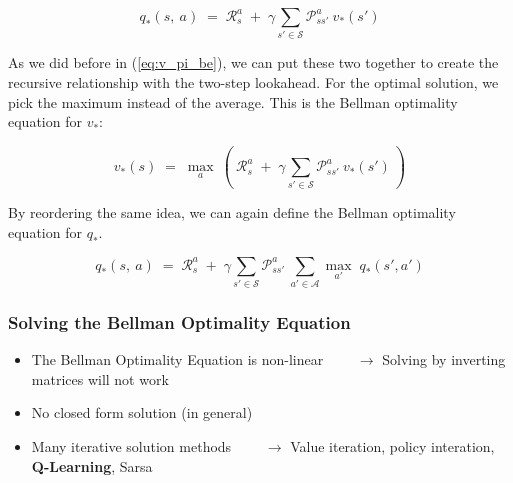 \documentclass[10pt]{article}
\begin{document}
\begin{equation}
q_{*}(s,\:a)\;=\;\mathcal{R}_{s}^{a}\;+\;\gamma \sum_{s' \in \mathcal{S}} \mathcal{P}_{ss'}^{a}\:v_{*}(s')
\end{equation}

As we did before in (\ref{eq:v_pi_be}), we can put these two together to create the recursive relationship with the two-step lookahead. For the optimal solution, we pick the maximum instead of the average. This is the Bellman optimality equation for $v_{*}$:

\begin{equation}
v_{*}(s)\;=\;\mathop{max}_{a}\: \left( \: \mathcal{R}_{s}^{a}\;+\;\gamma \sum_{s' \in \mathcal{S}} \mathcal{P}_{ss'}^{a}\:v_{*}(s') \: \right)
\end{equation}

By reordering the same idea, we can again define the Bellman optimality equation for $q_{*}$. 

\begin{equation}
q_{*}(s,\:a)\;=\;\mathcal{R}_{s}^{a}\;+\;\gamma \sum_{s' \in \mathcal{S}} \mathcal{P}_{ss'}^{a}\: \sum_{a' \in \mathcal{A}} \mathop{max}_{a'} \; q_{*}(s', a')
\end{equation}

\subsubsection*{Solving the Bellman Optimality Equation}

\begin{itemize}
\item The Bellman Optimality Equation is non-linear \newline
$\qquad \rightarrow$ Solving by inverting matrices will not work
\item No closed form solution (in general)
\item Many iterative solution methods \newline
$\qquad \rightarrow$ Value iteration, policy interation, \textbf{Q-Learning}, Sarsa
\end{itemize}
\newline 
\end{document}
